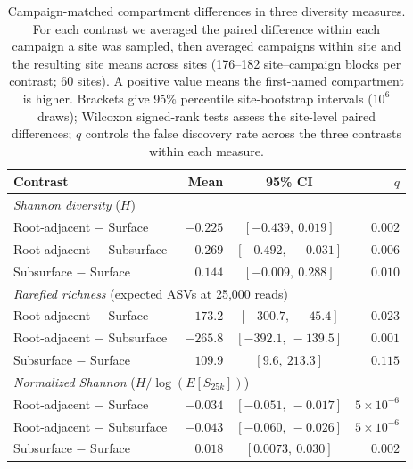 \begin{table}[htbp]
\centering
\footnotesize
\caption{Campaign-matched compartment differences in three diversity measures.
For each contrast we averaged the paired difference within each campaign a site
was sampled, then averaged campaigns within site and the resulting site means across sites (176--182 site--campaign blocks per
contrast; 60 sites). A positive value means the first-named compartment is
higher. Brackets give 95\% percentile site-bootstrap intervals ($10^{6}$ draws);
Wilcoxon signed-rank tests assess the site-level paired differences; $q$ controls the false discovery rate across the three contrasts within each
measure.}
\label{tab:matched-alpha}
\begin{tabular}{lrcr}
\toprule
Contrast & Mean & 95\% CI & $q$ \\
\midrule
\multicolumn{4}{l}{\textit{Shannon diversity} ($H$)} \\
\quad Root-adjacent $-$ Surface & $-0.225$ & $[-0.439,\ 0.019]$ & $0.002$ \\
\quad Root-adjacent $-$ Subsurface & $-0.269$ & $[-0.492,\ -0.031]$ & $0.006$ \\
\quad Subsurface $-$ Surface & $\phantom{-}0.144$ & $[-0.009,\ 0.288]$ & $0.010$ \\
\midrule
\multicolumn{4}{l}{\textit{Rarefied richness} (expected ASVs at 25{,}000 reads)} \\
\quad Root-adjacent $-$ Surface & $-173.2$ & $[-300.7,\ -45.4]$ & $0.023$ \\
\quad Root-adjacent $-$ Subsurface & $-265.8$ & $[-392.1,\ -139.5]$ & $0.001$ \\
\quad Subsurface $-$ Surface & $\phantom{-}109.9$ & $[9.6,\ 213.3]$ & $0.115$ \\
\midrule
\multicolumn{4}{l}{\textit{Normalized Shannon} ($H/\log(E[S_{25k}])$)} \\
\quad Root-adjacent $-$ Surface & $-0.034$ & $[-0.051,\ -0.017]$ & $5\times10^{-6}$ \\
\quad Root-adjacent $-$ Subsurface & $-0.043$ & $[-0.060,\ -0.026]$ & $5\times10^{-6}$ \\
\quad Subsurface $-$ Surface & $\phantom{-}0.018$ & $[0.0073,\ 0.030]$ & $0.002$ \\
\bottomrule
\end{tabular}
\end{table}
